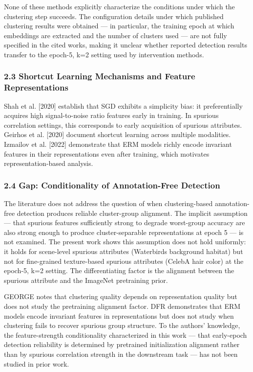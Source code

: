 None of these methods explicitly characterize the conditions under which the clustering step succeeds. The configuration details under which published clustering results were obtained — in particular, the training epoch at which embeddings are extracted and the number of clusters used — are not fully specified in the cited works, making it unclear whether reported detection results transfer to the epoch-5, k=2 setting used by intervention methods.

\subsubsection{2.3 Shortcut Learning Mechanisms and Feature Representations}

Shah et al. [2020] establish that SGD exhibits a simplicity bias: it preferentially acquires high signal-to-noise ratio features early in training. In spurious correlation settings, this corresponds to early acquisition of spurious attributes. Geirhos et al. [2020] document shortcut learning across multiple modalities. Izmailov et al. [2022] demonstrate that ERM models richly encode invariant features in their representations even after training, which motivates representation-based analysis.

\subsubsection{2.4 Gap: Conditionality of Annotation-Free Detection}

The literature does not address the question of when clustering-based annotation-free detection produces reliable cluster-group alignment. The implicit assumption — that spurious features sufficiently strong to degrade worst-group accuracy are also strong enough to produce cluster-separable representations at epoch 5 — is not examined. The present work shows this assumption does not hold uniformly: it holds for scene-level spurious attributes (Waterbirds background habitat) but not for fine-grained texture-based spurious attributes (CelebA hair color) at the epoch-5, k=2 setting. The differentiating factor is the alignment between the spurious attribute and the ImageNet pretraining prior.

GEORGE \citep{Sohonietal2020} notes that clustering quality depends on representation quality but does not study the pretraining alignment factor. DFR \citep{Izmailovetal2022} demonstrates that ERM models encode invariant features in representations but does not study when clustering fails to recover spurious group structure. To the authors' knowledge, the feature-strength conditionality characterized in this work — that early-epoch detection reliability is determined by pretrained initialization alignment rather than by spurious correlation strength in the downstream task — has not been studied in prior work.

